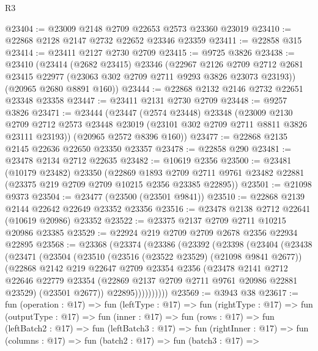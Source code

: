 \begin{lexlean}{R3}
\begin{coremodule}
@23404 := @23009 @2148 @2709 @22653 @2573 @23360 @23019
@23410 := @22868 @2128 @2147 @2732 @22652 @23346 @23359
@23411 := @22858 @315
@23414 := @23411 @2127 @2730 @2709
@23415 := @9725 @3826
@23438 := @23410
    (@23414
      (@2682 @23415)
      @23346
      (@22967
        @2126
        @2709
        @2712
        @2681
        @23415
        @22977
        (@23063 @302 @2709 @2711 @9293 @3826 @23073 @23193))
      (@20965 @2680 @8891 @160))
@23444 := @22868 @2132 @2146 @2732 @22651 @23348 @23358
@23447 := @23411 @2131 @2730 @2709
@23448 := @9257 @3826
@23471 := @23444
    (@23447
      (@2574 @23448)
      @23348
      (@23009
        @2130
        @2709
        @2712
        @2573
        @23448
        @23019
        (@23101 @302 @2709 @2711 @8811 @3826 @23111 @23193))
      (@20965 @2572 @8396 @160))
@23477 := @22868 @2135 @2145 @22636 @22650 @23350 @23357
@23478 := @22858 @290
@23481 := @23478 @2134 @2712 @22635
@23482 := @10619 @2356
@23500 := @23481
    (@10179 @23482)
    @23350
    (@22869
      @1893
      @2709
      @2711
      @9761
      @23482
      @22881
      (@23375 @219 @2709 @2709 @10215 @2356 @23385 @22895))
@23501 := @21098 @9373
@23504 := @23477 (@23500 (@23501 @9841))
@23510 := @22868 @2139 @2144 @22642 @22649 @23352 @23356
@23516 := @23478 @2138 @2712 @22641 (@10619 @20986) @23352
@23522 := @23375 @2137 @2709 @2711 @10215 @20986 @23385
@23529 := @22924 @219 @2709 @2709 @2678 @2356 @22934 @22895
@23568 := @23368
    (@23374
      (@23386
        (@23392
          (@23398
            (@23404
              (@23438
                (@23471
                  (@23504
                    (@23510
                      (@23516 (@23522 @23529) (@21098 @9841 @2677))
                      (@22868
                        @2142
                        @219
                        @22647
                        @2709
                        @23354
                        @2356
                        (@23478
                          @2141
                          @2712
                          @22646
                          @22779
                          @23354
                          (@22869 @2137 @2709 @2711 @9761 @20986 @22881 @23529)
                          (@23501 @2677))
                        @22895))))))))))
@23569 := @3943 @38
@23617 := fun (operation : @17) =>
  fun (leftType : @17) =>
  fun (rightType : @17) =>
  fun (outputType : @17) =>
  fun (inner : @17) =>
  fun (rows : @17) =>
  fun (leftBatch2 : @17) =>
  fun (leftBatch3 : @17) =>
  fun (rightInner : @17) =>
  fun (columns : @17) =>
  fun (batch2 : @17) =>
  fun (batch3 : @17) =>

\end{coremodule}
\end{lexlean}
